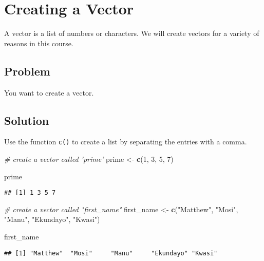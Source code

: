 \documentclass[]{book}
\newenvironment{Shaded}{\begin{snugshade}}{\end{snugshade}}
\newcommand{\KeywordTok}[1]{\textcolor[rgb]{0.13,0.29,0.53}{\textbf{{#1}}}}
\newcommand{\DecValTok}[1]{\textcolor[rgb]{0.00,0.00,0.81}{{#1}}}
\newcommand{\StringTok}[1]{\textcolor[rgb]{0.31,0.60,0.02}{{#1}}}
\newcommand{\CommentTok}[1]{\textcolor[rgb]{0.56,0.35,0.01}{\textit{{#1}}}}
\newcommand{\NormalTok}[1]{{#1}}
\begin{document}
\section{Creating a Vector}\label{vector}

A vector is a list of numbers or characters. We will create vectors for
a variety of reasons in this course.

\subsection{Problem}\label{problem-2}

You want to create a vector.

\subsection{Solution}\label{solution-2}

Use the function \texttt{c()} to create a list by separating the entries
with a comma.

\begin{Shaded}
\begin{Highlighting}[]
\CommentTok{# create a vector called 'prime'}
\NormalTok{prime <-}\StringTok{ }\KeywordTok{c}\NormalTok{(}\DecValTok{1}\NormalTok{, }\DecValTok{3}\NormalTok{, }\DecValTok{5}\NormalTok{, }\DecValTok{7}\NormalTok{)}

\NormalTok{prime}
\end{Highlighting}
\end{Shaded}

\begin{verbatim}
## [1] 1 3 5 7
\end{verbatim}

\begin{Shaded}
\begin{Highlighting}[]
\CommentTok{# create a vector called "first_name"}
\NormalTok{first_name <-}\StringTok{ }\KeywordTok{c}\NormalTok{(}\StringTok{"Matthew"}\NormalTok{, }\StringTok{"Mosi"}\NormalTok{, }\StringTok{"Manu"}\NormalTok{, }\StringTok{"Ekundayo"}\NormalTok{, }\StringTok{"Kwasi"}\NormalTok{)}

\NormalTok{first_name}
\end{Highlighting}
\end{Shaded}

\begin{verbatim}
## [1] "Matthew"  "Mosi"     "Manu"     "Ekundayo" "Kwasi"
\end{verbatim}
\end{document}
